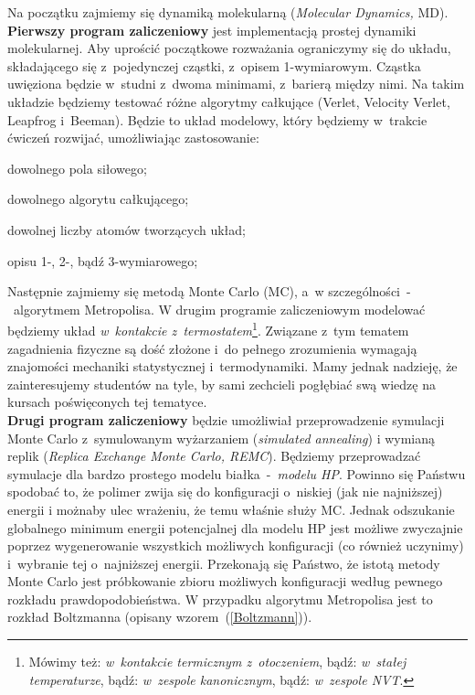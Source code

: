 \documentclass[a4paper,11pt,twoside]{book}
\newenvironment{packed_enum}{
\begin{enumerate}
  \setlength{\itemsep}{1pt}
  \setlength{\parskip}{0pt}
  \setlength{\parsep}{0pt}
}{\end{enumerate}}
\begin{document}
Na początku zajmiemy się dynamiką molekularną (\emph{Molecular Dynamics,} MD). {\bf Pierwszy program zaliczeniowy} jest implementacją prostej dynamiki molekularnej. Aby uprościć początkowe rozważania ograniczymy się do układu, składającego się z~pojedynczej cząstki, z~opisem 1-wymiarowym. Cząstka uwięziona będzie w~studni z~dwoma minimami, z~barierą między nimi. Na takim układzie będziemy testować różne algorytmy całkujące (Verlet, Velocity Verlet, Leapfrog i~Beeman). Będzie to układ modelowy, który będziemy w~trakcie ćwiczeń rozwijać, umożliwiając zastosowanie:
\begin{packed_enum}
\item dowolnego pola siłowego;
\item dowolnego algorytu całkującego;
\item dowolnej liczby atomów tworzących układ;
\item opisu 1-, 2-, bądź 3-wymiarowego;
\end{packed_enum}

Następnie zajmiemy się metodą Monte Carlo (MC), a~w szczególności~-~algorytmem Metropolisa. W drugim programie zaliczeniowym modelować będziemy układ \emph{w~kontakcie z~termostatem}\footnote{Mówimy też: \emph{w~kontakcie termicznym z~otoczeniem}, bądź: \emph{w~stałej temperaturze}, bądź: \emph{w~zespole kanonicznym}, bądź: \emph{w~zespole \emph{NVT}}.}. Związane z~tym tematem zagadnienia fizyczne są dość złożone i~do pełnego zrozumienia wymagają znajomości mechaniki statystycznej i~termodynamiki. Mamy jednak nadzieję, że zainteresujemy studentów na tyle, by sami zechcieli pogłębiać swą wiedzę na kursach poświęconych tej tematyce.\\

{\bf Drugi program zaliczeniowy} będzie umożliwiał przeprowadzenie symulacji Monte Carlo z~symulowanym wyżarzaniem (\emph{simulated annealing}) i wymianą replik (\emph{Replica Exchange Monte Carlo, REMC}). Będziemy przeprowadzać symulacje dla bardzo prostego modelu białka~-~\emph{modelu HP}. Powinno się Państwu spodobać to, że polimer zwija się do konfiguracji o~niskiej (jak nie najniższej) energii i możnaby ulec wrażeniu, że temu właśnie służy MC. Jednak odszukanie globalnego minimum energii potencjalnej dla modelu HP jest możliwe zwyczajnie poprzez wygenerowanie wszystkich możliwych konfiguracji (co również uczynimy) i~wybranie tej o~najniższej energii. Przekonają się Państwo, że istotą metody Monte Carlo jest próbkowanie zbioru możliwych konfiguracji według pewnego rozkładu prawdopodobieństwa. W przypadku algorytmu Metropolisa jest to rozkład Boltzmanna (opisany wzorem~(\ref{Boltzmann})).\\ 
\end{document}

